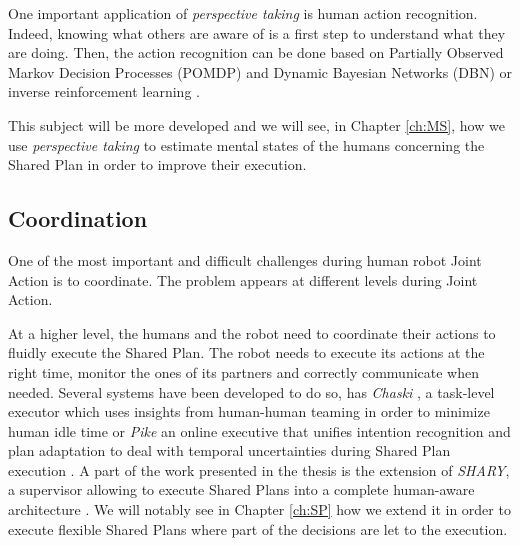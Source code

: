 \documentclass[english,a4paper,11pt,twoside]{StyleThese}
\begin{document}
One important application of \textit{perspective taking} is human action recognition. Indeed, knowing what others are aware of is a first step to understand what they are doing. Then, the action recognition can be done based on Partially Observed Markov Decision Processes (POMDP) and Dynamic Bayesian Networks (DBN) \cite{baker2014modeling} or inverse reinforcement learning \cite{nagai2015probabilistic}.

This subject will be more developed and we will see, in Chapter \ref{ch:MS}, how we use \textit{perspective taking} to estimate mental states of the humans concerning the Shared Plan in order to improve their execution.


\subsection{Coordination}

\label{subsec:coordination_robot}

One of the most important and difficult challenges during human robot Joint Action is to coordinate. The problem appears at different levels during Joint Action. 

At a higher level, the humans and the robot need to coordinate their actions to fluidly execute the Shared Plan. The robot needs to execute its actions at the right time, monitor the ones of its partners and correctly communicate when needed. Several systems have been developed to do so, has \textit{Chaski} \cite{shah2011improved}, a task-level executor which uses insights from human-human teaming in order to minimize human idle time or \textit{Pike} an online executive that unifies intention recognition and plan adaptation to deal with temporal uncertainties during Shared Plan execution \cite{karpas2015robust}. A part of the work presented in the thesis is the extension of \textit{SHARY}, a supervisor allowing to execute Shared Plans into a complete human-aware architecture \cite{clodic2009shary}. We will notably see in Chapter \ref{ch:SP} how we extend it in order to execute flexible Shared Plans where part of the decisions are let to the execution.
 
\end{document}
